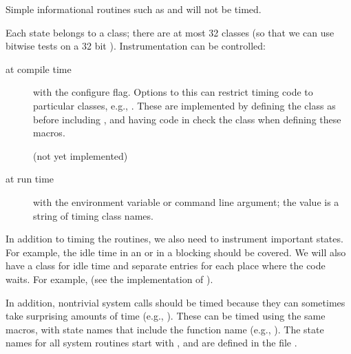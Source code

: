 \documentclass{article}
\begin{document}
Simple informational routines such as  and
 will not be timed.



Each state belongs to a class; there are at most 32 classes (so that we can use
bitwise tests on a 32 bit ).  Instrumentation can be
controlled:
\begin{description}
\item[at compile time]with the  configure flag.
 Options to this can restrict timing code to particular classes, e.g.,
 .  These are implemented by
 defining the class as  before including
 , and having code in  check the class
 when defining these macros.

 (not yet implemented)

\item[at run time]with the  environment variable or
   command line argument; the value is a string of timing
  class names.
\end{description}

In addition to timing the routines, we also need to instrument important
states.  For example, the idle time in an  or in a blocking
 should be covered.  We will also have a class for idle time
and separate entries for each place where the code waits.  For example,
 (see the implementation of ).

In addition, nontrivial system calls should be timed because they can
sometimes take surprising amounts of time (e.g., ).
These can be timed using the same macros, with state names that include the
function name (e.g., ).  The state
names for all system routines start with , and
are defined in the file .
\end{document}
